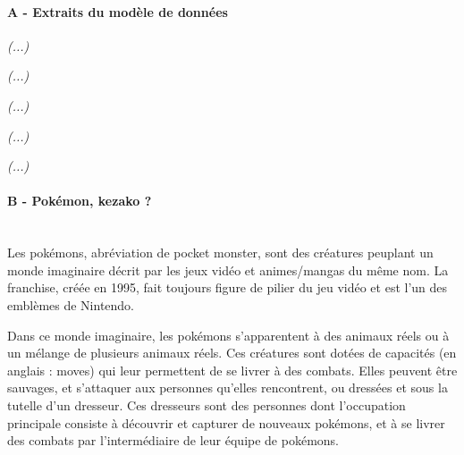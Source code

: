 \paragraph{A - Extraits du modèle de données}
\hspace{0pt}


\emph{(...)}



\emph{(...)}



\emph{(...)}



\emph{(...)}



\emph{(...)}


\paragraph{B - Pokémon, kezako ?\\\\}

Les pokémons, abréviation de pocket monster, sont des créatures peuplant un monde imaginaire décrit par les jeux vidéo et animes/mangas du même nom. La franchise, créée en 1995, fait toujours figure de pilier du jeu vidéo et est l'un des emblèmes de Nintendo.

Dans ce monde imaginaire, les pokémons s'apparentent à des animaux réels ou à un mélange de plusieurs animaux réels. Ces créatures sont dotées de capacités (en anglais : moves) qui leur permettent de se livrer à des combats. Elles peuvent être sauvages, et s’attaquer aux personnes qu’elles rencontrent, ou dressées et sous la tutelle d’un dresseur. Ces dresseurs sont des personnes dont l’occupation principale consiste à découvrir et capturer de nouveaux pokémons, et à se livrer des combats par l’intermédiaire de leur équipe de pokémons.


